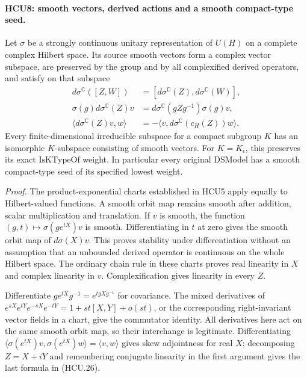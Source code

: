 \paragraph{HCU8: smooth vectors, derived actions and a smooth compact-type seed.}
\label{claim:HCU8}
Let \(\sigma\) be a strongly continuous unitary representation of \(U(H)\)
on a complete complex Hilbert space.  Its source smooth vectors form a
complex vector subspace, are preserved by the group and by all
complexified derived operators, and satisfy on that subspace
\[
 \begin{split}
 d\sigma^{\mathbb C}([Z,W])&=
     [d\sigma^{\mathbb C}(Z),d\sigma^{\mathbb C}(W)],\\
 \sigma(g)d\sigma^{\mathbb C}(Z)v
   &=d\sigma^{\mathbb C}(gZg^{-1})\sigma(g)v,\\
 \langle d\sigma^{\mathbb C}(Z)v,w\rangle
   &=-\langle v,d\sigma^{\mathbb C}(c_H(Z))w\rangle .
 \end{split}
 \tag{HCU.26}
\]
Every finite-dimensional irreducible subspace for a compact subgroup
\(K\) has an isomorphic \(K\)-subspace consisting of smooth vectors.
For \(K=K_\epsilon\), this preserves its exact
\(\mathrm{IsKTypeOf}\) weight.  In particular every original DSModel
has a smooth compact-type seed of its specified lowest weight.

\emph{Proof.}
The product-exponential charts established in HCU5 apply equally to
Hilbert-valued functions.  A smooth orbit map remains smooth after
addition, scalar multiplication and translation.  If \(v\) is smooth,
the function \((g,t)\mapsto\sigma(g e^{tX})v\) is smooth.
Differentiating in \(t\) at zero gives the smooth orbit map of
\(d\sigma(X)v\).  This proves stability under differentiation without
an assumption that an unbounded derived operator is continuous on the
whole Hilbert space.  The ordinary chain rule in these charts proves
real linearity in \(X\) and complex linearity in \(v\).  Complexification
gives linearity in every \(Z\).

Differentiate
\(g e^{tX}g^{-1}=e^{t gXg^{-1}}\) for covariance.
The mixed derivatives of
\(e^{sX}e^{tY}e^{-sX}e^{-tY}=1+st[X,Y]+o(st)\), or the
corresponding right-invariant vector fields in a chart, give the
commutator identity.  All derivatives here act on the same smooth
orbit map, so their interchange is legitimate.
Differentiating
\(\langle\sigma(e^{tX})v,\sigma(e^{tX})w\rangle=\langle v,w\rangle\)
gives skew adjointness for real \(X\); decomposing \(Z=X+iY\)
and remembering conjugate linearity in the first argument gives the
last formula in (HCU.26).

